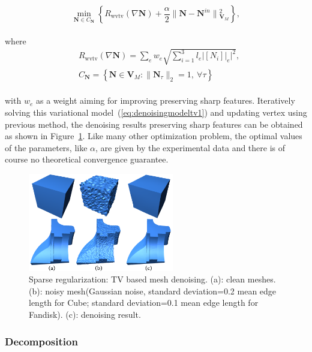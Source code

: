 \small{
\begin{equation}
 \label{eq:denoisingmodeltv1}
 \min_{\mathbf{N}\in C_{\mathbf{N}}}
 \left\{
 R_{\textrm{wvtv}}(\nabla \mathbf{N})+
 \frac{\alpha}{2} \| \mathbf{N}-\mathbf{N}^{in} \|{_{\mathbf{V}_M}^{2}}
 \right\},
\end{equation}
}
\\
where
\small{
\begin{equation}
 \label{eq:denoisingmodeltv2}
 \begin{aligned}
 & R_{\textrm{wvtv}}(\nabla \mathbf{N})
 = \sum_{e}^{} w_{e}   \sqrt{\sum_{i=1}^{3}  l_{e} | [N_{i}]|_{e} |^2},\\
 & C_{\mathbf{N}}=\left\{ \mathbf{N}\in\mathbf{V}_M: \| \mathbf{N}_{\tau} \|_2=1,~\forall\tau  \right\}
 \end{aligned}
\end{equation}
}
\\
with $w_{e}$ as a weight aiming for improving preserving sharp features.
Iteratively solving this variational model~(\ref{eq:denoisingmodeltv1}) and updating vertex using previous method, the denoising results preserving sharp features can be obtained as shown in Figure~\ref{fig:denoise_tv}.
Like many other optimization problem, the optimal values of the parameters, like $\alpha$, are given by the experimental data and there is of course no theoretical convergence guarantee.

\begin{figure}[ht]
  \centering
  \includegraphics[width=2.5in]{images/denoise_tv}
  \caption{Sparse regularization: TV based mesh denoising\cite{zhang2014variational}. (a): clean meshes. (b): noisy mesh(Gaussian noise, standard deviation=0.2 mean edge length for Cube; standard deviation=0.1 mean edge length for Fandisk). (c): denoising result.}
  \label{fig:denoise_tv}
\end{figure}


\subsubsection{Decomposition}
\label{subsubsection:Decompsition}

